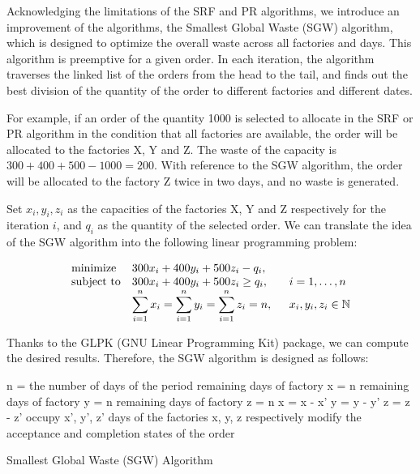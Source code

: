 \documentclass[a4paper, 12pt]{article}
\begin{document}
Acknowledging the limitations of the SRF and PR algorithms, we introduce an improvement of the algorithms,
the Smallest Global Waste (SGW) algorithm, which is designed to optimize the overall waste across all factories and days.
This algorithm is preemptive for a given order. In each iteration, the algorithm traverses the linked list of the orders from the head to the tail,
and finds out the best division of the quantity of the order to different factories and different dates. 

For example, if an order of the quantity 1000 is selected to allocate in the SRF or PR algorithm in the condition that all factories are available,
the order will be allocated to the factories X, Y and Z. The waste of the capacity is $300+400+500-1000 = 200$. 
With reference to the SGW algorithm, the order will be allocated to the factory Z twice in two days, and no waste is generated.

Set $x_i, y_i, z_i$ as the capacities of the factories X, Y and Z respectively for the iteration $i$, and $q_i$ as the quantity of the selected order. We can translate the idea of the SGW algorithm into the following linear programming problem:

\begin{equation*}
    \begin{array}{ll@{}ll}
    \text{minimize}  & \displaystyle 300x_i+400y_i+500z_i - q_i,      &\\
    \text{subject to}& \displaystyle 300x_i+400y_i+500z_i \geq q_i,  \qquad  & i = 1 ,\dots, n\\
                     &  \displaystyle \sum_{i=1}^{n}x_i = \sum_{i=1}^{n}y_i = \sum_{i=1}^{n}z_i  = n,          & x_i, y_i, z_i \in \mathbb{N} \\
    \end{array}
\end{equation*}

Thanks to the GLPK (GNU Linear Programming Kit) package, we can compute the desired results. Therefore, the SGW algorithm is designed as follows:

\begin{algorithm}
    n = the number of days of the period\;
    remaining days of factory x = n\;
    remaining days of factory y = n\;
    remaining days of factory z = n\;
     {
         {
            x = x - x'\;
            y = y - y'\;
            z = z - z'\;
            occupy x', y', z' days of the factories x, y, z respectively\;
            modify the acceptance and completion states of the order\;
        }
    }
    \caption{Smallest Global Waste (SGW) Algorithm}
\end{algorithm}
\end{document}
